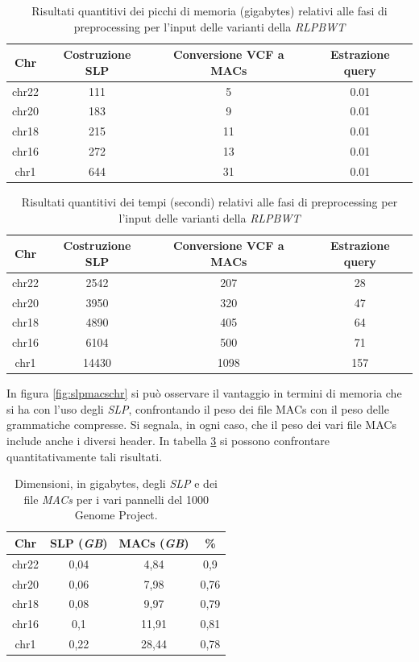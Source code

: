 \begin{table}
  \centering
  \small
  \caption{Risultati quantitivi dei picchi di memoria (gigabytes) relativi alle
    fasi di 
    preprocessing per l'input delle varianti della \textit{RLPBWT}}
  \label{tab:prepmem}
  \begin{tabular}{c||c|c|c}
    \textbf{Chr} & \textbf{Costruzione SLP} & \textbf{Conversione VCF a MACs}
    & \textbf{Estrazione query}\\
    \hline
    \hline
    chr22 & 111 & 5 & 0.01 \\
    chr20 & 183 & 9 & 0.01 \\
    chr18 & 215 & 11 & 0.01 \\
    chr16 & 272 & 13 & 0.01 \\
    chr1 & 644 & 31 & 0.01 
  \end{tabular}
\end{table}
\begin{table}
  \centering
  \small
  \caption{Risultati quantitivi dei tempi (secondi) relativi alle fasi di
    preprocessing per l'input delle varianti della \textit{RLPBWT}}
  \label{tab:preptime}
  \begin{tabular}{c||c|c|c}
    \textbf{Chr} & \textbf{Costruzione SLP} & \textbf{Conversione VCF a MACs}
    & \textbf{Estrazione query}\\
    \hline
    \hline
    chr22 & 2542 & 207 & 28 \\
    chr20 & 3950 & 320 & 47 \\
    chr18 & 4890 & 405 & 64 \\
    chr16 & 6104 & 500 & 71 \\
    chr1 & 14430 & 1098 & 157
  \end{tabular}
\end{table}
In figura \ref{fig:slpmacschr} si può osservare il vantaggio in termini di
memoria che si ha con l'uso degli \textit{SLP}, confrontando il peso dei file
MACs con il peso delle grammatiche compresse. Si segnala, in ogni caso, che il
peso dei vari file MACs include anche i diversi header. In tabella
\ref{tab:slpmacs} si possono
confrontare quantitativamente tali risultati.
\begin{table}
  \centering
  \caption{Dimensioni, in gigabytes, degli \textit{SLP} e dei file \textit{MACs}
  per i vari pannelli del 1000 Genome Project.}
  \begin{tabular}{c||c|c|c}
    \textbf{Chr} & \textbf{SLP (\textit{GB})}
    & \textbf{MACs (\textit{GB})} & \textbf{\%}\\
    \hline
    \hline
    chr22 & 0,04 & 4,84 & 0,9\\
    chr20 & 0,06 & 7,98 & 0,76\\
    chr18 & 0,08 & 9,97 & 0,79\\
    chr16 & 0,1 & 11,91 & 0,81\\
    chr1 & 0,22 & 28,44 & 0,78\\
  \end{tabular}
  \label{tab:slpmacs}
\end{table}
